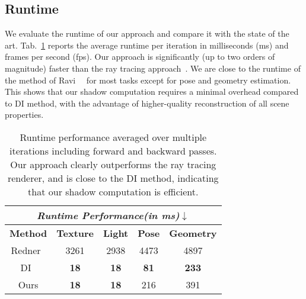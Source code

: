 \subsection{Runtime}
%
We evaluate the runtime of our approach and compare it with the state of the art.
%
Tab.~\ref{tab:runtime} reports the average runtime per iteration in milliseconds (ms) and frames per second (fps).
%
Our approach is significantly (up to two orders of magnitude) faster than the ray tracing  approach~\cite{li2018differentiable}.
%
We are close to the runtime of the method of Ravi~\etal~\cite{ravi2020pytorch3d} for most tasks except for pose and geometry estimation.
%
This shows that our shadow computation requires a minimal overhead compared to DI method, with the advantage of higher-quality reconstruction of all scene properties.
%
%
\begin{table}
	\begin{center}
	
		\begin{tabular}{|c|c|c|c|c|}
			\hline
			\multicolumn{5}{|c|}{\textit{Runtime Performance(in ms)$\downarrow$ }} \\
			\hline
			\textbf{Method}                                             & \textbf{Texture }      & \textbf{Light }              & 
			\textbf{Pose } 	 & 
			\textbf{Geometry }   \\
			\hline
			Redner~\cite{li2018differentiable}						& 3261  & 2938  & 4473   &4897                        \\
			DI~\cite{ravi2020pytorch3d} 							& \textbf{18}  & \textbf{18}  & \textbf{81} & \textbf{233}
			      		                    \\
			\hline
			Ours    									   	            & \textbf{18}	& \textbf{18}  & 216 &391                                          
			\\     
			\hline
		\end{tabular}
	\end{center}
	\caption
	{
		Runtime performance averaged over multiple iterations including forward and backward passes.
		Our approach clearly outperforms the ray tracing renderer, and is  close to the DI method, indicating that our shadow computation is efficient.
	}
	\label{tab:runtime}
\end{table}
%
%
%
